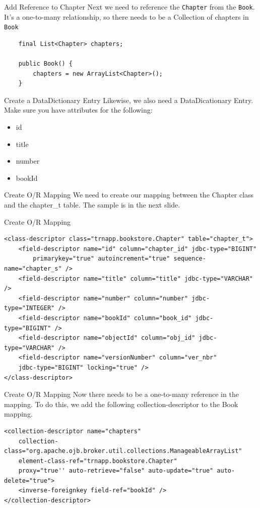 \documentclass[xcolor=dvipsnames,14pt,professionalfonts]{beamer}
\begin{document}
 \begin{frame}[fragile]{Add Reference to Chapter}
   Next we need to reference the \texttt{Chapter} from the
   \texttt{Book}. It's a one-to-many relationship, so there needs to
   be a Collection of chapters in \texttt{Book}
 \begin{verbatim}
    final List<Chapter> chapters;
    
    public Book() {
        chapters = new ArrayList<Chapter>();
    }
    \end{verbatim}
\end{frame}
   

 \begin{frame}{Create a DataDictionary Entry}
   Likewise, we also need a DataDicationary Entry. Make sure you have
   attributes for the following:
   \begin{itemize}
     \item id
     \item title
     \item number
     \item bookId
   \end{itemize}
 \end{frame}

 \begin{frame}{Create O/R Mapping}
   We need to create our mapping between the Chapter class and the
   chapter\_t table. The sample is in the next slide.
 \end{frame}

 \begin{frame}[fragile]{Create O/R Mapping}
 \begin{verbatim}
<class-descriptor class="trnapp.bookstore.Chapter" table="chapter_t">
    <field-descriptor name="id" column="chapter_id" jdbc-type="BIGINT" 
        primarykey="true" autoincrement="true" sequence-name="chapter_s" />
    <field-descriptor name="title" column="title" jdbc-type="VARCHAR" />
    <field-descriptor name="number" column="number" jdbc-type="INTEGER" />
    <field-descriptor name="bookId" column="book_id" jdbc-type="BIGINT" />
    <field-descriptor name="objectId" column="obj_id" jdbc-type="VARCHAR" />
    <field-descriptor name="versionNumber" column="ver_nbr" 
    jdbc-type="BIGINT" locking="true" />
</class-descriptor>
    \end{verbatim}
\end{frame}

 \begin{frame}[fragile]{Create O/R Mapping}
Now there needs to be a one-to-many reference in the mapping. To do
this, we add the following collection-descriptor to the Book mapping.
 \begin{verbatim}
<collection-descriptor name="chapters" 
    collection-class="org.apache.ojb.broker.util.collections.ManageableArrayList"
    element-class-ref="trnapp.bookstore.Chapter"
    proxy="true'' auto-retrieve="false" auto-update="true" auto-delete="true">
    <inverse-foreignkey field-ref="bookId" />
</collection-descriptor>
    \end{verbatim}
\end{frame}
\end{document}
